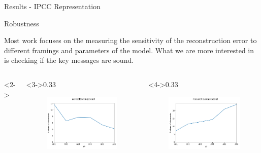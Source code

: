 \documentclass[9pt]{beamer}
\begin{document}
\begin{frame}{Results - IPCC Representation}
\end{frame}

\begin{frame}{Robustness}

Most work focuses on the measuring the sensitivity of the reconstruction error to different framings and parameters of the model. What we are more interested in is checking if the key messages are sound.

\begin{columns}<2->
	\begin{column}<3->{0.33\linewidth}
		\begin{figure}
			\includegraphics[width=\linewidth]{../plots/aero_share}
		\end{figure}
	\end{column}
	
	\begin{column}<4->{0.33\linewidth}
		\begin{figure}
			\includegraphics[width=\linewidth]{../plots/sus_share}
		\end{figure}
	\end{column}
	

\end{columns}
\end{frame}
\end{document}
